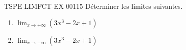 \begin{exercice}{TSPE-LIMFCT-EX-001}{1}{5}
Déterminer les limites suivantes.
\begin{enumerate}
  \item $\lim_{x \to +\infty} (3x^3 - 2x + 1)$
  \item $\lim_{x \to -\infty} (3x^3 - 2x + 1)$
\end{enumerate}
\end{exercice}
